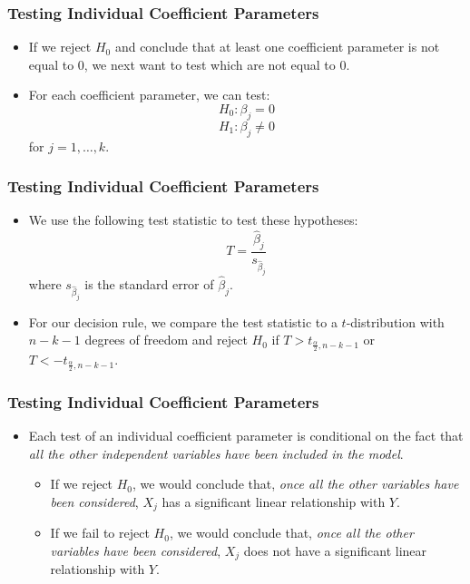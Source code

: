 \documentclass[14pt]{beamer}
\begin{document}
\begin{frame}
	\frametitle{Testing Individual Coefficient Parameters}
	
	\begin{itemize}[label={\color{blue}$\blacktriangleright$}]
		\item If we reject $H_0$ and conclude that at least one coefficient parameter is not equal to 0, we next want to test which are not equal to 0.
		
		\item For each coefficient parameter, we can test:
		\[
		H_0 : \beta_j = 0
		\]
		\[
		H_1 : \beta_j \neq 0
		\]
		for $j = 1,\ldots,k$.
	\end{itemize}
	
\end{frame}
\begin{frame}
	\frametitle{Testing Individual Coefficient Parameters}
	
	\begin{itemize}[label={\color{blue}$\blacktriangleright$}]
		\item We use the following test statistic to test these hypotheses:
		\[
		T = \frac{\hat{\beta}_j}{s_{\hat{\beta}_j}}
		\]
		where $s_{\hat{\beta}_j}$ is the standard error of $\hat{\beta}_j$.
		
		\item For our decision rule, we compare the test statistic to a $t$-distribution with $n-k-1$ degrees of freedom and reject $H_0$ if $T > t_{\frac{\alpha}{2},n-k-1}$ or $T < -t_{\frac{\alpha}{2},n-k-1}$.
	\end{itemize}
	
\end{frame}
\begin{frame}
	\frametitle{Testing Individual Coefficient Parameters}
	
	\begin{itemize}[label={\color{blue}$\blacktriangleright$}]
		\item Each test of an individual coefficient parameter is conditional on the fact that \textit{all the other independent variables have been included in the model}.
		
		\begin{itemize}[label={\color{blue}$\blacktriangleright$}]
			\item If we reject $H_0$, we would conclude that, \textit{once all the other variables have been considered}, $X_j$ has a significant linear relationship with $Y$.
			
			\item If we fail to reject $H_0$, we would conclude that, \textit{once all the other variables have been considered}, $X_j$ does not have a significant linear relationship with $Y$.
		\end{itemize}
	\end{itemize}
	
\end{frame}
\end{document}
